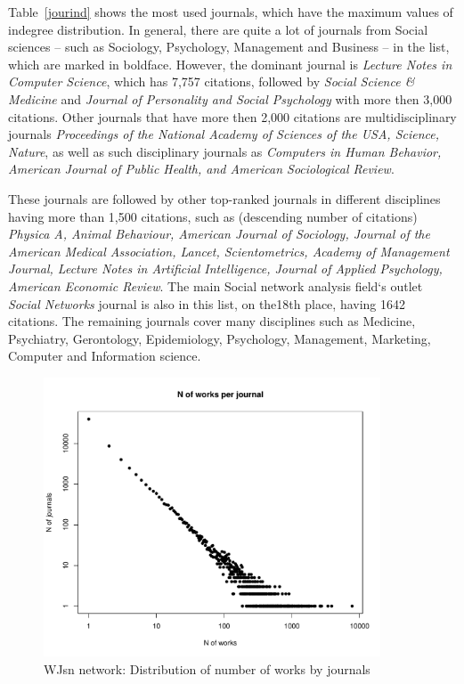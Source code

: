 \documentclass[11pt]{article} %
\begin{document}
Table~\ref{jourind} shows the most used journals, which have the maximum values of indegree distribution. In general, there are quite a lot of journals from Social sciences -- such as Sociology, Psychology, Management and Business -- in the list, which are marked in boldface. However, the dominant journal is \textit{Lecture Notes in Computer Science}, which has 7,757 citations, followed by \textit{Social Science \& Medicine} and \textit{Journal of Personality and Social Psychology} with more then 3,000 citations. 
Other journals that have more then 2,000 citations are multidisciplinary journals \textit{Proceedings of the National Academy of Sciences of the USA, Science, Nature}, as well as  such disciplinary journals as \textit{Computers in Human Behavior, American Journal of Public Health, and American Sociological Review}.  \medskip

 These journals are followed by other top-ranked journals in different disciplines having more than 1,500 citations, such as (descending number of citations) \textit{Physica A, Animal Behaviour, American Journal of Sociology, Journal of the American Medical Association,  Lancet, Scientometrics, Academy of Management Journal, Lecture Notes in Artificial Intelligence, Journal of Applied Psychology, American Economic Review}. The main Social network analysis field`s outlet \textit{Social Networks} journal is also in this list, on the18th place, having 1642 citations. The remaining journals cover many disciplines such as  Medicine, Psychiatry, Gerontology, Epidemiology, Psychology, Management, Marketing, Computer and Information science. \medskip

\begin{figure}
\centerline{\includegraphics[width=100mm]{Rplot_WJs_new_indeg.pdf}}
\caption{WJsn network: Distribution of number of works by journals}\label{worksjour}
\end{figure}
\medskip   
\end{document}
